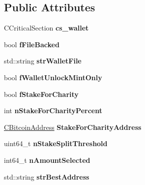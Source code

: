 \subsection*{Public Attributes}
\begin{DoxyCompactItemize}
\item 
\mbox{\label{class_c_wallet_a4e6eb889f7638ed9695fdc0731581428}} 
C\+Critical\+Section {\bfseries cs\+\_\+wallet}
\item 
\mbox{\label{class_c_wallet_a1b2e285b4d7bd105c792941aa666249c}} 
bool {\bfseries f\+File\+Backed}
\item 
\mbox{\label{class_c_wallet_a3e886f3a3b20228770e082b3fc014fc7}} 
std\+::string {\bfseries str\+Wallet\+File}
\item 
\mbox{\label{class_c_wallet_aee0d38434fa6c6030acff3a678cce082}} 
bool {\bfseries f\+Wallet\+Unlock\+Mint\+Only}
\item 
\mbox{\label{class_c_wallet_a835c4280fe4d91042eac0eadb65674e2}} 
bool {\bfseries f\+Stake\+For\+Charity}
\item 
\mbox{\label{class_c_wallet_aebd98bfdd4ab20a7bfd0c881bb956cd9}} 
int {\bfseries n\+Stake\+For\+Charity\+Percent}
\item 
\mbox{\label{class_c_wallet_a8673f711b34599e73e03eb03d3b29803}} 
\mbox{\hyperlink{class_c_bitcoin_address}{C\+Bitcoin\+Address}} {\bfseries Stake\+For\+Charity\+Address}
\item 
\mbox{\label{class_c_wallet_a72dfdee9ef3d28f15e25f12321ea28bb}} 
uint64\+\_\+t {\bfseries n\+Stake\+Split\+Threshold}
\item 
\mbox{\label{class_c_wallet_a9fcfad8c1580cbb246339d83ccd96b76}} 
int64\+\_\+t {\bfseries n\+Amount\+Selected}
\item 
\mbox{\label{class_c_wallet_af855bf13364a7d0f24efe61f0ace251a}} 
std\+::string {\bfseries str\+Best\+Address}
\item 
\mbox{\label{class_c_wallet_a4b21040969aab6248c92be1dcea925e7}} 

\end{DoxyCompactItemize}
